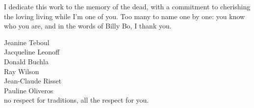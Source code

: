  
 
I dedicate this work to the memory of the dead, with a commitment to cherishing the loving living while I'm one of you. Too many to name one by one: you know who you are, and in the words of Billy Bo, I thank you.

\vspace{5mm}

\noindent Jeanine Teboul\\
Jacqueline Leonoff\\
Donald Buchla\\
Ray Wilson\\
Jean-Claude Risset\\
Pauline Oliveros\\ 

no respect for traditions, all the respect for you. 